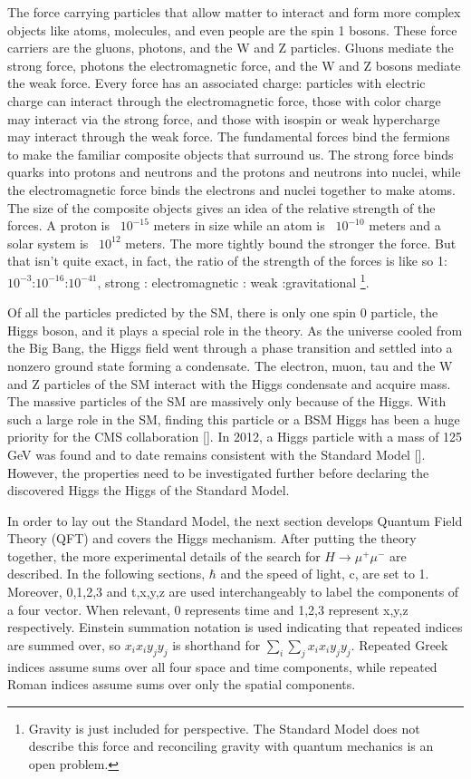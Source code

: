 The force carrying particles that allow matter to interact and form more complex objects like atoms, molecules, and even people are the spin 1 bosons. These force carriers are the gluons, photons, and the W and Z particles. Gluons mediate the strong force, photons the electromagnetic force, and the W and Z bosons mediate the weak force. Every force has an associated charge: particles with electric charge can interact through the electromagnetic force, those with color charge may interact via the strong force, and those with isospin or weak hypercharge may interact through the weak force. The fundamental forces bind the fermions to make the familiar composite objects that surround us. The strong force binds quarks into protons and neutrons and the protons and neutrons into nuclei, while the electromagnetic force binds the electrons and nuclei together to make atoms. The size of the composite objects gives an idea of the relative strength of the forces. A proton is ~$10^{-15}$ meters in size while an atom is ~$10^{-10}$ meters and a solar system is ~$10^{12}$ meters. The more tightly bound the stronger the force. But that isn't quite exact, in fact, the ratio of the strength of the forces is like so 1:$10^{-3}$:$10^{-16}$:$10^{-41}$, strong : electromagnetic : weak :gravitational \footnote{Gravity is just included for perspective. The Standard Model does not describe this force and reconciling gravity with quantum mechanics is an open problem.}. 

Of all the particles predicted by the SM, there is only one spin 0 particle, the Higgs boson, and it plays a special role in the theory. As the universe cooled from the Big Bang, the Higgs field went through a phase transition and settled into a nonzero ground state forming a condensate. The electron, muon, tau and the W and Z particles of the SM interact with the Higgs condensate and acquire mass. The massive particles of the SM are massively only because of the Higgs. With such a large role in the SM, finding this particle or a BSM Higgs has been a huge priority for the CMS collaboration [\cite{tdr}]. In 2012, a Higgs particle with a mass of 125 GeV was found and to date remains consistent with the Standard Model [\cite{atlasdiscovery,cmsdiscovery2012,cmsdiscovery2013}]. However, the properties need to be investigated further before declaring the discovered Higgs the Higgs of the Standard Model. 

In order to lay out the Standard Model, the next section develops Quantum Field Theory (QFT) and covers the Higgs mechanism. After putting the theory together, the more experimental details of the search for $H\rightarrow\mu^+\mu^-$ are described. In the following sections, $\hbar$ and the speed of light, c, are set to 1. Moreover, 0,1,2,3 and t,x,y,z are used interchangeably to label the components of a four vector. When relevant, 0 represents time and 1,2,3 represent x,y,z respectively. Einstein summation notation is used indicating that repeated indices are summed over, so $x_ix_i y_jy_j$ is shorthand for $\sum_i\sum_j x_ix_i y_jy_j$. Repeated Greek indices assume sums over all four space and time components, while repeated Roman indices assume sums over only the spatial components. 

